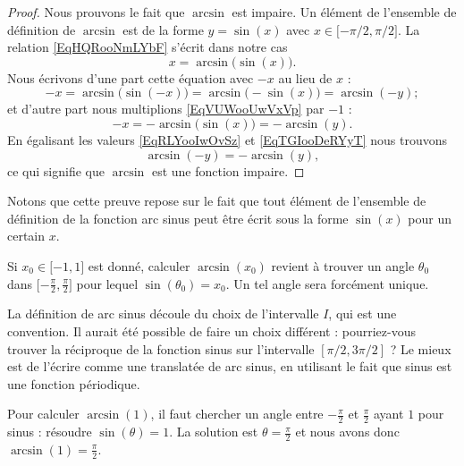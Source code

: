 	\begin{proof}
		Nous prouvons le fait que \( \arcsin\) est impaire. Un élément de l'ensemble de définition de \( \arcsin\) est de la forme \( y=\sin(x)\) avec \( x\in\mathopen[ -\pi/2 , \pi/2 \mathclose]\). La relation \eqref{EqHQRooNmLYbF} s'écrit dans notre cas
		\begin{equation}    \label{EqVUWooUwVxVp}
			x=\arcsin\big( \sin(x) \big).
		\end{equation}
		Nous écrivons d'une part cette équation avec \( -x\) au lieu de \( x\) :
		\begin{equation}    \label{EqRLYooIwOvSz}
			-x=\arcsin\big( \sin(-x) \big)=\arcsin\big( -\sin(x) \big)=\arcsin(-y);
		\end{equation}
		et d'autre part nous multiplions \eqref{EqVUWooUwVxVp} par \( -1\) :
		\begin{equation}    \label{EqTGIooDeRYyT}
			-x=-\arcsin\big( \sin(x) \big)=-\arcsin(y).
		\end{equation}
		En égalisant les valeurs \eqref{EqRLYooIwOvSz} et \eqref{EqTGIooDeRYyT} nous trouvons
		\begin{equation}
			\arcsin(-y)=-\arcsin(y),
		\end{equation}
		ce qui signifie que \( \arcsin\) est une fonction impaire.
	\end{proof}
	Notons que cette preuve repose sur le fait que tout élément de l'ensemble de définition de la fonction arc sinus peut être écrit sous la forme \( \sin(x)\) pour un certain \( x\).

	Si \( x_0\in\mathopen[ -1 , 1 \mathclose]\) est donné, calculer \( \arcsin(x_0)\) revient à trouver un angle \( \theta_0\) dans \( \mathopen[ -\frac{ \pi }{2} , \frac{ \pi }{2} \mathclose]\) pour lequel \( \sin(\theta_0)=x_0\). Un tel angle sera forcément unique.

	\begin{remark}
		La définition de arc sinus découle du choix de l'intervalle $I$, qui est une convention. Il aurait été possible de faire un choix différent : pourriez-vous trouver la réciproque de la fonction sinus sur l'intervalle $[\pi/2, 3\pi/2]$ ? Le mieux est de l'écrire comme une translatée de arc sinus, en utilisant le fait que sinus est une fonction périodique.
	\end{remark}

	\begin{example}
		Pour calculer \( \arcsin(1)\), il faut chercher un angle entre \( -\frac{ \pi }{2}\) et \( \frac{ \pi }{ 2 }\) ayant \( 1\) pour sinus : résoudre \( \sin(\theta)=1\). La solution est \( \theta=\frac{ \pi }{2}\) et nous avons donc \( \arcsin(1)=\frac{ \pi }{2}\).
	\end{example}

